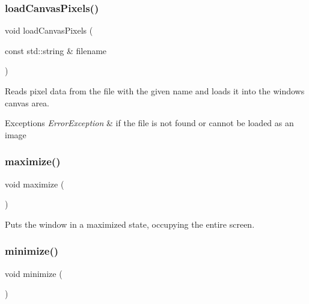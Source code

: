 \subsubsection{\texorpdfstring{load\+Canvas\+Pixels()}{loadCanvasPixels()}}
{\footnotesize\ttfamily void load\+Canvas\+Pixels (\begin{DoxyParamCaption}\item[{const std\+::string \&}]{filename }\end{DoxyParamCaption})\hspace{0.3cm}{\ttfamily [virtual]}}



Reads pixel data from the file with the given name and loads it into the window\textquotesingle{}s canvas area. 


\begin{DoxyExceptions}{Exceptions}
{\em Error\+Exception} & if the file is not found or cannot be loaded as an image \\
\hline
\end{DoxyExceptions}
\mbox{\label{classsgl_1_1GWindow_a1aa481996525792213f28d91fbb4894b}} 
\subsubsection{\texorpdfstring{maximize()}{maximize()}}
{\footnotesize\ttfamily void maximize (\begin{DoxyParamCaption}{ }\end{DoxyParamCaption})\hspace{0.3cm}{\ttfamily [virtual]}}



Puts the window in a maximized state, occupying the entire screen. 

\mbox{\label{classsgl_1_1GWindow_a85ffaebe489c0ecf8051715ecf59babb}} 
\subsubsection{\texorpdfstring{minimize()}{minimize()}}
{\footnotesize\ttfamily void minimize (\begin{DoxyParamCaption}{ }\end{DoxyParamCaption})\hspace{0.3cm}{\ttfamily [virtual]}}



